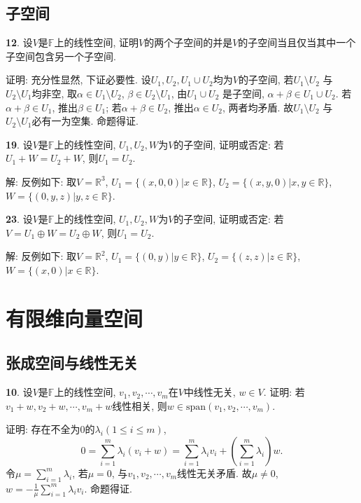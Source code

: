 \subsection{子空间}

\par \textbf{12}. 设$V$是$\mathbb{F}$上的线性空间, 证明$V$的两个子空间的并是$V$的子空间当且仅当其中一个子空间包含另一个子空间.
\par 证明: 充分性显然, 下证必要性. 设$U_1,U_2, U_1 \cup U_2$均为$V$的子空间, 若$U_1\setminus U_2$ 与$U_2\setminus U_1$均非空, 取$\alpha \in U_1\setminus U_2$, $\beta \in U_2\setminus U_1$, 由$U_1 \cup U_2$ 是子空间, $\alpha+\beta \in U_1 \cup U_2$. 若$\alpha+\beta \in U_1$, 推出$\beta \in U_1$; 若$\alpha+\beta \in U_2$, 推出$\alpha \in U_2$, 两者均矛盾. 故$U_1\setminus U_2$ 与$U_2\setminus U_1$必有一为空集. 命题得证.

\par \textbf{19}. 设$V$是$\mathbb{F}$上的线性空间, $U_1,U_2,W$为$V$的子空间, 证明或否定: 若$U_1+W=U_2+W$, 则$U_1=U_2$.
\par 解: 反例如下: 取$V=\mathbb{R}^3$, $U_1=\{(x,0,0)|x\in \mathbb{R}\}$, $U_2=\{(x,y,0)|x,y\in \mathbb{R}\}$, $W=\{(0,y,z)|y,z\in \mathbb{R}\}$.

\par \textbf{23}. 设$V$是$\mathbb{F}$上的线性空间, $U_1,U_2,W$为$V$的子空间, 证明或否定: 若$V=U_1\oplus W=U_2\oplus W$, 则$U_1=U_2$.
\par 解: 反例如下: 取$V=\mathbb{R}^2$, $U_1=\{(0,y)|y\in \mathbb{R}\}$, $U_2=\{(z,z)|z\in \mathbb{R}\}$, $W=\{(x,0)|x\in \mathbb{R}\}$.

\section{有限维向量空间}

\subsection{张成空间与线性无关}

\par \textbf{10}. 设$V$是$\mathbb{F}$上的线性空间, $v_1,v_2,\cdots,v_m$在$V$中线性无关, $w\in V$. 证明: 若$v_1+w,v_2+w,\cdots,v_m+w$线性相关, 则$w \in \text{span}(v_1,v_2,\cdots,v_m)$.
\par 证明: 存在不全为0的$\lambda_i (1\le i\le m)$,
\begin{displaymath}
0=\sum_{i=1}^m \lambda_i(v_i+w)=\sum_{i=1}^m \lambda_i v_i+ (\sum_{i=1}^m \lambda_i)w.
\end{displaymath}
令$\mu=\sum_{i=1}^m \lambda_i$, 若$\mu=0$, 与$v_1,v_2,\cdots,v_m$线性无关矛盾. 故$\mu\neq 0$, $w=-\frac{1}{\mu}\sum_{i=1}^m \lambda_i v_i$. 命题得证.

